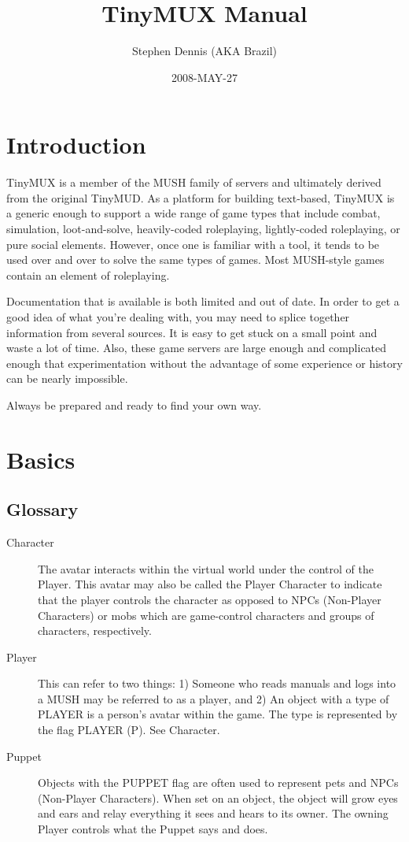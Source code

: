 \documentclass[dvips]{book}
\title{TinyMUX Manual}
\author{Stephen Dennis (AKA Brazil)}
\date{2008-MAY-27}
\begin{document}
\frontmatter
\maketitle

\mainmatter
\chapter{Introduction}
TinyMUX is a member of the MUSH family of servers and ultimately
derived from the original TinyMUD.
As a platform for building text-based, TinyMUX is a generic enough to support
a wide range of game types that include combat, simulation, loot-and-solve,
heavily-coded roleplaying, lightly-coded roleplaying, or pure social elements.
However, once one is familiar with a tool, it tends to be used over and over
to solve the same types of games.
Most MUSH-style games contain an element of roleplaying.

Documentation that is available is both limited and out of date. In order to
get a good idea of what you're dealing with, you may need to splice together
information from several sources. It is easy to get stuck on a small point
and waste a lot of time.  Also, these game servers are large enough and
complicated enough that experimentation without the advantage of some
experience or history can be nearly impossible.

Always be prepared and ready to find your own way.

\chapter{Basics}
\section{Glossary}

\begin{description}
\item[Character]
The avatar interacts within the virtual world under the
control of the Player.
This avatar may also be called the Player Character to indicate that the
player controls the character as opposed to NPCs (Non-Player Characters) or
mobs which are game-control characters and groups of characters, respectively.

\item[Player]
This can refer to two things: 1) Someone who reads manuals and
logs into a MUSH may be referred to as a player, and 2) An object with a type of
PLAYER is a person's avatar within the game.
The type is represented by the flag PLAYER (P).
See Character.

\item[Puppet]
Objects with the PUPPET flag are often used to represent pets and NPCs
(Non-Player Characters).
When set on an object, the object will grow eyes and ears and relay everything
it sees and hears to its owner. The owning Player controls what the Puppet
says and does.

\end{description}
\end{document}
